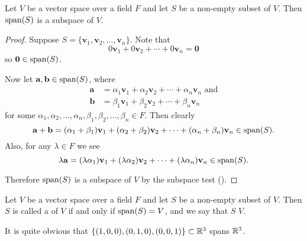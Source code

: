 \begin{proposition}
    Let $V$ be a vector space over a field $F$ and let $S$ be a non-empty subset of $V$. Then $\mathrm{span}(S)$ is a subspace of $V$.
\end{proposition}
\begin{proof}
    Suppose $S = \{\mathbf{v}_1, \mathbf{v}_2, \dots, \mathbf{v}_n\}$. Note that
    \[
        0\mathbf{v}_1 + 0\mathbf{v}_2 + \cdots + 0\mathbf{v}_n = \mathbf{0}
    \]
    so $\mathbf{0} \in \mathrm{span}(S)$.

    Now let $\mathbf{a}, \mathbf{b} \in \mathrm{span}(S)$, where
    \begin{align*}
        \mathbf{a} &= \alpha_1\mathbf{v}_1 + \alpha_2\mathbf{v}_2 + \cdots + \alpha_n\mathbf{v}_n \text{ and}\\
        \mathbf{b} &= \beta_1\mathbf{v}_1 + \beta_2\mathbf{v}_2 + \cdots + \beta_n\mathbf{v}_n
    \end{align*}
    for some $\alpha_1, \alpha_2, \dots, \alpha_n, \beta_1, \beta_2, \dots, \beta_n \in F$. Then clearly
    \[
        \mathbf{a} + \mathbf{b} = (\alpha_1+\beta_1)\mathbf{v}_1 + (\alpha_2+\beta_2)\mathbf{v}_2 + \cdots + (\alpha_n+\beta_n)\mathbf{v}_n \in \mathrm{span}(S).
    \]
    Also, for any $\lambda \in F$ we see
    \[
        \lambda\mathbf{a} = (\lambda\alpha_1)\mathbf{v}_1 + (\lambda\alpha_2)\mathbf{v}_2 + \cdots + (\lambda\alpha_n)\mathbf{v}_n \in \mathrm{span}(S).
    \]

    Therefore $\mathrm{span}(S)$ is a subspace of $V$ by the subspace test ().
\end{proof}

\begin{definition}
    Let $V$ be a vector space over a field $F$ and let $S$ be a non-empty subset of $V$. Then $S$ is called a  of $V$ if and only if $\mathrm{span}(S) = V$, and we say that $S$  $V$.
\end{definition}

\begin{example}
    It is quite obvious that $\{(1, 0, 0), (0, 1, 0), (0, 0, 1)\} \subset \mathbb{R}^3$ spans $\mathbb{R}^3$.
\end{example}

